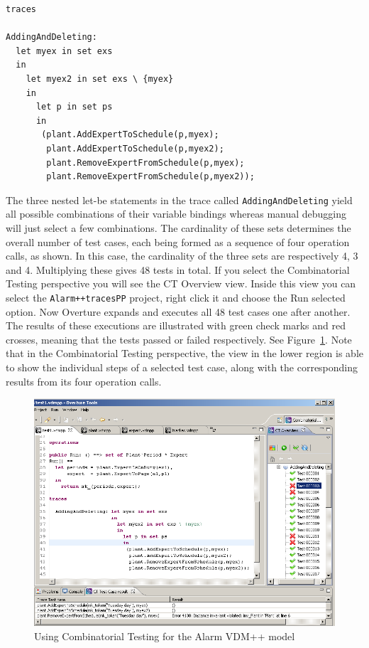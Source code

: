\begin{lstlisting}
traces

AddingAndDeleting: 
  let myex in set exs
  in
    let myex2 in set exs \ {myex}
    in
      let p in set ps 
      in
       (plant.AddExpertToSchedule(p,myex);
        plant.AddExpertToSchedule(p,myex2);
        plant.RemoveExpertFromSchedule(p,myex);
        plant.RemoveExpertFromSchedule(p,myex2));
\end{lstlisting}

\noindent The three nested let-be statements in the trace
called \texttt{AddingAndDeleting} yield all possible combinations of
their variable bindings whereas manual debugging will just select a
few combinations.  The cardinality of these sets determines the
overall number of test cases, each being formed as a sequence of four
operation calls, as shown. In this case, the cardinality of the three
sets are respectively 4, 3 and 4. Multiplying these gives 48 tests in total. If you
select the Combinatorial Testing perspective you will see the
\textsf{CT Overview} view. Inside this view you can select the \texttt{Alarm++tracesPP}
project, right click it and choose the \textsf{Run selected}
option. Now Overture expands and executes all 48 test cases one after
another. The results of these executions are illustrated with green
check marks and red crosses, meaning that the tests passed or failed
respectively. See Figure~\ref{fig:stracesalarm}. Note that in the
Combinatorial Testing perspective, the view in the lower region is
able to show the individual steps of a selected test case, along with
the corresponding results from its four operation calls.

\begin{figure}[htbp]
\begin{center}
\includegraphics[width=4.5in]{figures/tracesalarm}
\caption{Using Combinatorial Testing for the Alarm VDM++ model\label{fig:stracesalarm}}
\end{center}
\end{figure}

